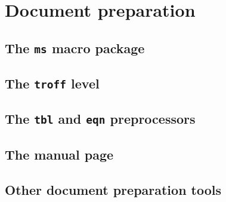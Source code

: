 \chapter{Document preparation}
\section{The \texttt{ms} macro package}
\section{The \texttt{troff} level}
\section{The \texttt{tbl} and \texttt{eqn} preprocessors}
\section{The manual page}
\section{Other document preparation tools}
